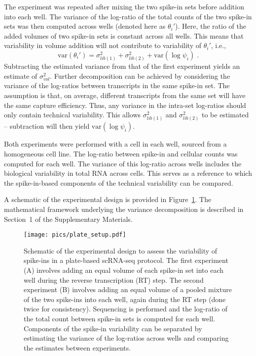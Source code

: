 \documentclass{article}
\begin{document}
The experiment was repeated after mixing the two spike-in sets before addition into each well. 
The variance of the log-ratio of the total counts of the two spike-in sets was then computed across wells (denoted here as $\theta_i'$).
Here, the ratio of the added volumes of two spike-in sets is constant across all wells.
This means that variability in volume addition will not contribute to variability of $\theta_i'$, i.e.,
\[
    \mbox{var}(\theta_i') = \sigma^2_{lib(1)} + \sigma^2_{lib(2)} + \mbox{var}(\log \psi_i) \;.
\]
Subtracting the estimated variance from that of the first experiment yields an estimate of $\sigma_{vol}^2$.
Further decomposition can be achieved by considering the variance of the log-ratios between transcripts in the same spike-in set.
The assumption is that, on average, different transcripts from the same set will have the same capture efficiency.
Thus, any variance in the intra-set log-ratios should only contain technical variability.
This allows $\sigma^2_{lib(1)}$ and $\sigma^2_{lib(2)}$ to be estimated -- subtraction will then yield $\mbox{var}(\log \psi_i)$.

Both experiments were performed with a cell in each well, sourced from a homogeneous cell line.
The log-ratio between spike-in and cellular counts was computed for each well.
The variance of this log-ratio across wells includes the biological variability in total RNA across cells.
This serves as a reference to which the spike-in-based components of the technical variability can be compared. 

A schematic of the experimental design is provided in Figure~\ref{fig:expdesign}.
The mathematical framework underlying the variance decomposition is described in Section~1 of the Supplementary Materials.


\begin{figure}[H]
\begin{center}
\texttt{[image: pics/plate\_setup.pdf]}
\end{center}
\caption{Schematic of the experimental design to assess the variability of spike-ins in a plate-based scRNA-seq protocol.
The first experiment (A) involves adding an equal volume of each spike-in set into each well during the reverse transcription (RT) step.
The second experiment (B) involves adding an equal volume of a pooled mixture of the two spike-ins into each well, again during the RT step (done twice for consistency).
Sequencing is performed and the log-ratio of the total count between spike-in sets is computed for each well.
Components of the spike-in variability can be separated by estimating the variance of the log-ratios across wells and comparing the estimates between experiments.
}
\label{fig:expdesign}
\end{figure}
\end{document}
